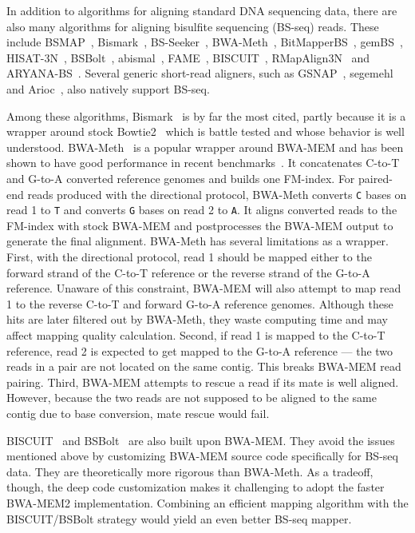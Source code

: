 \documentclass[webpdf,contemporary,large,namedate]{oup-authoring-template}%
\begin{document}
In addition to algorithms for aligning standard DNA sequencing data,
there are also many algorithms for aligning bisulfite sequencing (BS-seq) reads.
These include
BSMAP~\citep{Xi:2009aa},
Bismark~\citep{Krueger:2011aa},
BS-Seeker~\citep{Chen:2010aa,Guo:2013aa,Huang:2018aa},
BWA-Meth~\citep{Pedersen:2014aa},
BitMapperBS~\citep{Cheng:2018aa},
gemBS~\citep{Merkel:2019aa},
HISAT-3N~\citep{Zhang:2021ac},
BSBolt~\citep{Farrell:2021aa},
abismal~\citep{de_Sena_Brandine_2021},
FAME~\citep{Fischer_2023},
BISCUIT~\citep{Zhou:2024ac},
RMapAlign3N~\citep{Muller:2025aa}
and ARYANA-BS~\citep{Nikaein_2025}.
Several generic short-read aligners, such as
GSNAP~\citep{Wu:2010uq},
segemehl~\citep{Otto:2014aa}
and Arioc~\citep{Wilton:2018aa},
also natively support BS-seq.

Among these algorithms, Bismark~\citep{Krueger:2011aa} is by far the most cited,
partly because it is a wrapper around stock Bowtie2~\citep{Langmead:2012fk}
which is battle tested and whose behavior is well understood.
BWA-Meth~\citep{Pedersen:2014aa} is a popular wrapper around BWA-MEM
and has been shown to have good performance in recent benchmarks~\citep{Foox:2021aa,Gong_2022,Kerns_2025,Lin_2025}.
It concatenates C-to-T and G-to-A converted reference genomes and builds one FM-index.
For paired-end reads produced with the directional protocol,
BWA-Meth converts {\tt C} bases on read 1 to {\tt T} and converts {\tt G} bases on read 2 to {\tt A}.
It aligns converted reads to the FM-index with stock BWA-MEM
and postprocesses the BWA-MEM output to generate the final alignment.
BWA-Meth has several limitations as a wrapper.
First, with the directional protocol, read 1 should be mapped either to the forward strand of the C-to-T reference or the reverse strand of the G-to-A reference.
Unaware of this constraint, BWA-MEM will also attempt to map read 1 to the reverse C-to-T and forward G-to-A reference genomes.
Although these hits are later filtered out by BWA-Meth,
they waste computing time and may affect mapping quality calculation.
Second, if read 1 is mapped to the C-to-T reference, read 2 is expected to get mapped to the G-to-A reference
--- the two reads in a pair are not located on the same contig.
This breaks BWA-MEM read pairing.
Third, BWA-MEM attempts to rescue a read if its mate is well aligned.
However, because the two reads are not supposed to be aligned to the same contig due to base conversion,
mate rescue would fail.

BISCUIT~\citep{Zhou:2024ac} and BSBolt~\citep{Farrell:2021aa} are also built upon BWA-MEM.
They avoid the issues mentioned above by customizing BWA-MEM source code specifically for BS-seq data.
They are theoretically more rigorous than BWA-Meth.
As a tradeoff, though, the deep code customization makes it challenging to adopt the faster BWA-MEM2 implementation.
Combining an efficient mapping algorithm with the BISCUIT/BSBolt strategy would yield an even better BS-seq mapper.
\end{document}
